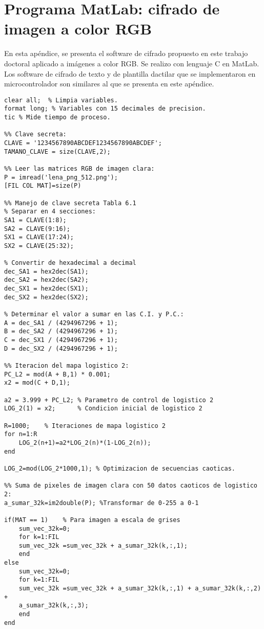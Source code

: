 
\chapter{Programa MatLab: cifrado de imagen a color RGB}

En esta apéndice, se presenta el software de cifrado propuesto en este trabajo doctoral aplicado a imágenes a color RGB. Se realizo con lenguaje C en MatLab. Los software de cifrado de texto y de plantilla dactilar que se implementaron en microcontrolador son similares al que se presenta en este apéndice. 

\begin{lstlisting}
clear all;  % Limpia variables.
format long; % Variables con 15 decimales de precision.
tic % Mide tiempo de proceso. 

%% Clave secreta:
CLAVE = '1234567890ABCDEF1234567890ABCDEF';
TAMANO_CLAVE = size(CLAVE,2);

%% Leer las matrices RGB de imagen clara:
P = imread('lena_png_512.png'); 
[FIL COL MAT]=size(P)

%% Manejo de clave secreta Tabla 6.1
% Separar en 4 secciones:
SA1 = CLAVE(1:8);
SA2 = CLAVE(9:16);
SX1 = CLAVE(17:24);
SX2 = CLAVE(25:32);

% Convertir de hexadecimal a decimal 
dec_SA1 = hex2dec(SA1);
dec_SA2 = hex2dec(SA2);
dec_SX1 = hex2dec(SX1);
dec_SX2 = hex2dec(SX2);

% Determinar el valor a sumar en las C.I. y P.C.:
A = dec_SA1 / (4294967296 + 1);
B = dec_SA2 / (4294967296 + 1);
C = dec_SX1 / (4294967296 + 1);
D = dec_SX2 / (4294967296 + 1);

%% Iteracion del mapa logistico 2:
PC_L2 = mod(A + B,1) * 0.001;
x2 = mod(C + D,1);

a2 = 3.999 + PC_L2; % Parametro de control de logistico 2
LOG_2(1) = x2;      % Condicion inicial de logistico 2

R=1000;    % Iteraciones de mapa logistico 2
for n=1:R
    LOG_2(n+1)=a2*LOG_2(n)*(1-LOG_2(n));
end

LOG_2=mod(LOG_2*1000,1); % Optimizacion de secuencias caoticas.

%% Suma de pixeles de imagen clara con 50 datos caoticos de logistico 2:
a_sumar_32k=im2double(P); %Transformar de 0-255 a 0-1

if(MAT == 1)    % Para imagen a escala de grises
    sum_vec_32k=0;
    for k=1:FIL
    sum_vec_32k =sum_vec_32k + a_sumar_32k(k,:,1);
    end    
else  
    sum_vec_32k=0;
    for k=1:FIL
    sum_vec_32k =sum_vec_32k + a_sumar_32k(k,:,1) + a_sumar_32k(k,:,2) + 
    a_sumar_32k(k,:,3);
    end
end


\end{lstlisting}

